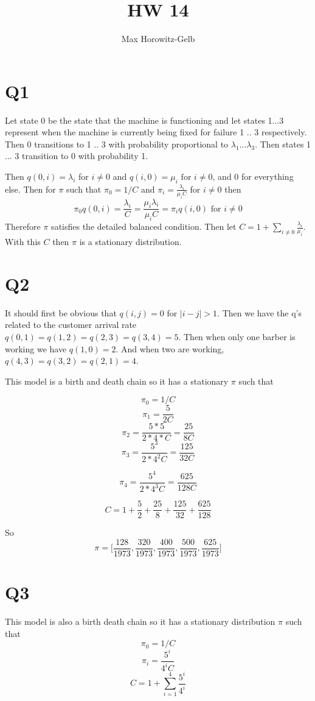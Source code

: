 \documentclass{article}
\title{HW 14}
\author{Max Horowitz-Gelb}
\begin{document}
\maketitle
\section*{Q1}
Let state 0 be the state that the machine is functioning and let states 1...3 represent when the machine is currently being fixed for failure 1 .. 3 respectively. Then 0 transitions to 1 .. 3 with probability proportional to $\lambda_1 ... \lambda_3$. Then states 1 ... 3 transition to 0 with probability 1. 

Then $q(0, i) = \lambda_i$ for $i \neq 0$ and $q(i, 0) = \mu_i \text{ for } i \neq 0$, and 0 for everything else. Then for $\pi$ such that $\pi_0 = 1 / C$ and $\pi_i = \frac{\lambda_i}{\mu_i C} $ for $i \neq 0$ then 
$$
\pi_0 q(0,i) = \frac{\lambda_i}{C} = \frac{\mu_i \lambda_i}{\mu_iC} = \pi_i q(i,0) \text{ for } i \neq 0
$$
Therefore $\pi$ satisfies the detailed balanced condition. Then let $C = 1 + \sum_{i \neq 0} \frac{\lambda_i}{\mu_i}$. With this $C$ then $\pi$ is a stationary distribution. 


\section*{Q2}
It should first be obvious that $q(i,j) = 0$ for $\lvert i - j \rvert > 1$.
Then we have the q's related to the customer arrival rate
$q(0,1) = q(1,2) = q(2,3) = q(3,4) = 5. $
Then when only one barber is working we have
$q(1,0) = 2$. And when two are working, $q(4,3)= q(3,2) = q(2,1) = 4$. 

This model is a birth and death chain so it has a stationary  $\pi$ such that

$$\pi_0 = 1 / C$$
$$\pi_1 = \frac{5}{2C}$$
$$\pi_2 = \frac{5*5}{2*4*C} = \frac{25}{8C}$$
$$
\pi_3 = \frac{5^3}{2*4^2C} = \frac{125}{32C}
$$

$$
\pi_4 = \frac{5^4}{2*4^3C} = \frac{625}{128C}
$$

$$C = 1 + \frac{5}{2} + \frac{25}{8} + \frac{125}{32} + \frac{625}{128}$$

So 
$$
\pi = \bigg[ \frac{128}{1973} , \frac{320}{1973} , \frac{400}{1973}, \frac{500}{1973}, \frac{625}{1973} \bigg]
$$


\section*{Q3}
This model is also a birth death chain so it has a stationary distribution $\pi$ such that
$$
\pi_0 = 1/C
$$
$$
\pi_i = \frac{5^i}{4^iC}
$$
$$
C = 1 + \sum_{i = 1}^4 \frac{5^i}{4^i}
$$
\end{document}
